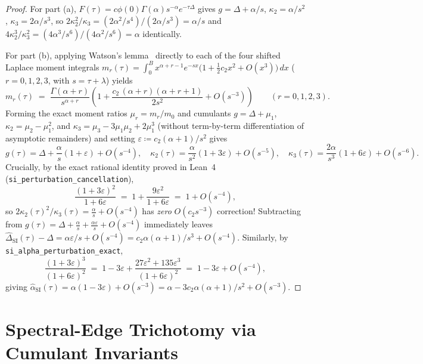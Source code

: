 \documentclass[11pt,a4paper]{article}
\theoremstyle{definition}
\begin{document}
\begin{proof}
For part (a), $F(\tau) = c\phi(0)\Gamma(\alpha) s^{-\alpha} e^{-\tau\Delta}$ gives $g = \Delta + \alpha/s$, $\kappa_2 = \alpha/s^2$, $\kappa_3 = 2\alpha/s^3$, so $2\kappa_2^2/\kappa_3 = (2\alpha^2/s^4)/(2\alpha/s^3) = \alpha/s$ and $4\kappa_2^3/\kappa_3^2 = (4\alpha^3/s^6)/(4\alpha^2/s^6) = \alpha$ identically.

For part (b), applying Watson's lemma~\cite{Erdelyi1956Asymptotic} directly to each of the four shifted Laplace moment integrals $m_r(\tau) = \int_0^B x^{\alpha + r - 1} e^{-s x}\bigl(1 + \frac{1}{2} c_2 x^2 + O(x^3)\bigr)\,dx$ ($r = 0, 1, 2, 3$, with $s = \tau + \lambda$) yields
\[
  m_r(\tau) \;=\; \frac{\Gamma(\alpha + r)}{s^{\alpha + r}}\left(1 + \frac{c_2\,(\alpha + r)(\alpha + r + 1)}{2 s^2} + O(s^{-3})\right)
  \qquad (r = 0, 1, 2, 3).
\]
Forming the exact moment ratios $\mu_r = m_r/m_0$ and cumulants $g = \Delta + \mu_1$, $\kappa_2 = \mu_2 - \mu_1^2$, and $\kappa_3 = \mu_3 - 3\mu_1\mu_2 + 2\mu_1^3$ (without term-by-term differentiation of asymptotic remainders) and setting $\varepsilon \coloneqq c_2(\alpha+1)/s^2$ gives
\[
  g(\tau) = \Delta + \frac{\alpha}{s}(1 + \varepsilon) + O(s^{-4}), \quad
  \kappa_2(\tau) = \frac{\alpha}{s^2}(1 + 3\varepsilon) + O(s^{-5}), \quad
  \kappa_3(\tau) = \frac{2\alpha}{s^3}(1 + 6\varepsilon) + O(s^{-6}).
\]
Crucially, by the exact rational identity proved in Lean~4 (\texttt{si\_perturbation\_cancellation}),
\[
  \frac{(1 + 3\varepsilon)^2}{1 + 6\varepsilon} \;=\; 1 + \frac{9\varepsilon^2}{1 + 6\varepsilon} \;=\; 1 + O(s^{-4}),
\]
so $2\kappa_2(\tau)^2 / \kappa_3(\tau) = \frac{\alpha}{s} + O(s^{-4})$ has \emph{zero} $O(c_2 s^{-3})$ correction! Subtracting from $g(\tau) = \Delta + \frac{\alpha}{s} + \frac{\alpha \varepsilon}{s} + O(s^{-4})$ immediately leaves $\widehat{\Delta}_{\mathrm{SI}}(\tau) - \Delta = \alpha\varepsilon / s + O(s^{-4}) = c_2\alpha(\alpha+1)/s^3 + O(s^{-4})$. Similarly, by \texttt{si\_alpha\_perturbation\_exact},
\[
  \frac{(1 + 3\varepsilon)^3}{(1 + 6\varepsilon)^2} \;=\; 1 - 3\varepsilon + \frac{27\varepsilon^2 + 135\varepsilon^3}{(1 + 6\varepsilon)^2} \;=\; 1 - 3\varepsilon + O(s^{-4}),
\]
giving $\widehat{\alpha}_{\mathrm{SI}}(\tau) = \alpha(1 - 3\varepsilon) + O(s^{-3}) = \alpha - 3 c_2 \alpha(\alpha+1)/s^2 + O(s^{-3})$.
\end{proof}

\section{Spectral-Edge Trichotomy via Cumulant Invariants}
\label{sec:trichotomy}
\end{document}
